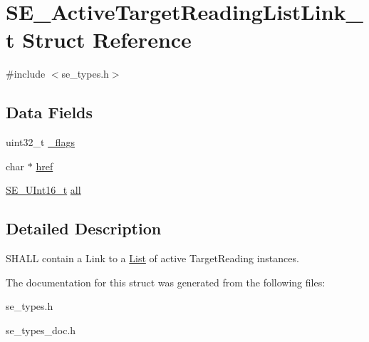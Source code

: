 \hypertarget{structSE__ActiveTargetReadingListLink__t}{}\section{S\+E\+\_\+\+Active\+Target\+Reading\+List\+Link\+\_\+t Struct Reference}
\label{structSE__ActiveTargetReadingListLink__t}


{\ttfamily \#include $<$se\+\_\+types.\+h$>$}

\subsection*{Data Fields}
\begin{DoxyCompactItemize}
\item 
uint32\+\_\+t \hyperlink{group__ActiveTargetReadingListLink_ga40bd728c6927ba6addca7bee573a5386}{\+\_\+flags}
\item 
char $\ast$ \hyperlink{group__ActiveTargetReadingListLink_ga48381c17bdb45f1d5529dcf34049108d}{href}
\item 
\hyperlink{group__UInt16_gac68d541f189538bfd30cfaa712d20d29}{S\+E\+\_\+\+U\+Int16\+\_\+t} \hyperlink{group__ActiveTargetReadingListLink_gacaadf42bb01e65b4e8b1c76df59e38af}{all}
\end{DoxyCompactItemize}


\subsection{Detailed Description}
S\+H\+A\+LL contain a Link to a \hyperlink{structList}{List} of active Target\+Reading instances. 

The documentation for this struct was generated from the following files\+:\begin{DoxyCompactItemize}
\item 
se\+\_\+types.\+h\item 
se\+\_\+types\+\_\+doc.\+h\end{DoxyCompactItemize}
